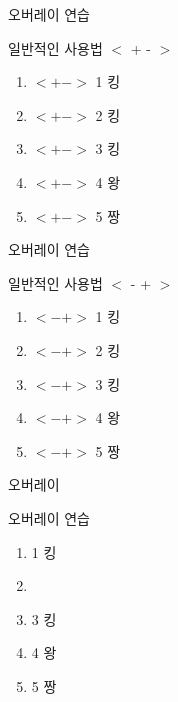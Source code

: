 \documentclass[ aspectratio=169,  10pt,blue,xcolor=pdftex,dvipsnames,table,handout,notes]{beamer}
\begin{document}
		\begin{frame}[t]{오버레이 연습 }

			\begin{block} {일반적인 사용법 $<$ + - $>$}
			\begin{enumerate}
			\item <+-> $<+->$ 1 킹
			\item <+-> $<+->$ 2 킹
			\item <+-> $<+->$ 3 킹
			\item <+-> $<+->$ 4 왕
			\item <+-> $<+->$ 5 짱
			\end{enumerate}
			\end{block}

		\end{frame}



		\begin{frame}[t]{오버레이 연습 }

			\begin{block} {일반적인 사용법 $<$ - + $>$}
			\begin{enumerate}
			\item <-+> $<-+>$ 1 킹
			\item <-+> $<-+>$ 2 킹
			\item <-+> $<-+>$ 3 킹
			\item <-+> $<-+>$ 4 왕
			\item <-+> $<-+>$ 5 짱
			\end{enumerate}
			\end{block}

		\end{frame}




		\begin{frame}[t]{오버레이}

			\begin{block} {오버레이 연습}
			\begin{enumerate}
			\item <1-6> 1 킹
			\item <2-6> 
			\item <3-6> 3 킹
			\item <4-6> 4 왕
			\item <5-6> 5 짱
			
			\end{enumerate}
			\end{block}

		\end{frame}




\end{document}
